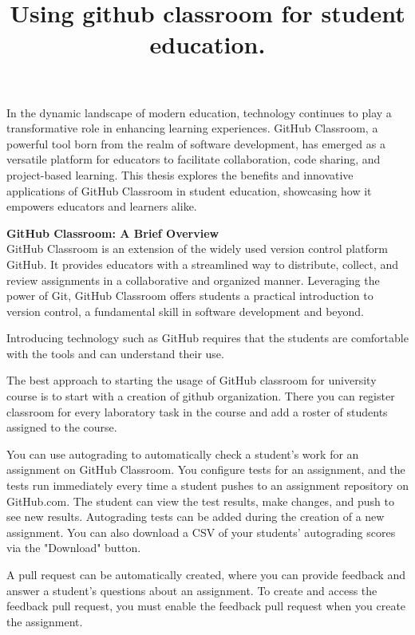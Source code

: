 \documentclass[a5paper, 10pt]{article}
\begin{document}
\title{Using github classroom for student education. }



\address{Chernivtsi National University}

\vspace{1cm}

In the dynamic landscape of modern education, technology continues to play a transformative role in enhancing learning experiences. GitHub Classroom, a powerful tool born from the realm of software development, has emerged as a versatile platform for educators to facilitate collaboration, code sharing, and project-based learning. This thesis explores the benefits and innovative applications of GitHub Classroom in student education, showcasing how it empowers educators and learners alike.

\textbf{GitHub Classroom: A Brief Overview} \\
GitHub Classroom is an extension of the widely used version control platform GitHub. It provides educators with a streamlined way to distribute, collect, and review assignments in a collaborative and organized manner. Leveraging the power of Git, GitHub Classroom offers students a practical introduction to version control, a fundamental skill in software development and beyond. \cite{git_classroom}

Introducing technology such as GitHub requires that the students are comfortable with the
tools and can understand their use.

The best approach to starting the usage of GitHub classroom for university course is to start with a creation of github organization. There you can register classroom for every laboratory task in the course and add a roster of students assigned to the course.

You can use autograding to automatically check a student's work for an assignment on GitHub Classroom. You configure tests for an assignment, and the tests run immediately every time a student pushes to an assignment repository on GitHub.com. The student can view the test results, make changes, and push to see new results. Autograding tests can be added during the creation of a new assignment. You can also download a CSV of your students' autograding scores via the "Download" button.

A pull request can be automatically created, where you can provide feedback and answer a student's questions about an assignment. To create and access the feedback pull request, you must enable the feedback pull request when you create the assignment.
\end{document}
